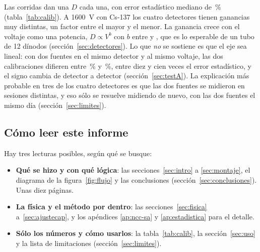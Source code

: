 \documentclass[11pt,a4paper]{article}
\begin{document}
Las \NCorridas{} corridas dan una $D$ cada una, con error estadístico
mediano de \ErrRelMediano\,\% (tabla~\ref{tab:calib}). A 1600~V con Cs-137
los cuatro detectores tienen ganancias muy distintas, un factor
\RazonGanancias{} entre el mayor y el menor. La ganancia crece con el voltaje
como una potencia, $D \propto V^{b}$ con $b$ entre \BMin{} y \BMax, que es lo
esperable de un tubo de 12 dínodos (sección~\ref{sec:detectores}). Lo que
\emph{no} se sostiene es que el eje sea lineal: con dos fuentes en el mismo
detector y al mismo voltaje, las dos calibraciones difieren entre
\DesacMin\,\% y \DesacMax\,\%, entre diez y cien veces el error estadístico, y el signo
cambia de detector a detector (sección~\ref{sec:testA}). La explicación más
probable en tres de los cuatro detectores es que las dos fuentes se midieron
en sesiones distintas, y eso sólo se resuelve midiendo de nuevo, con las dos
fuentes el mismo día (sección~\ref{sec:limites}).

\subsection{Cómo leer este informe}
\label{sec:comoleer}

Hay tres lecturas posibles, según qué se busque:

\begin{itemize}
\item \textbf{Qué se hizo y con qué lógica}: las secciones~\ref{sec:intro} a
      \ref{sec:montaje}, el diagrama de la figura~\ref{fig:flujo} y las
      conclusiones (sección~\ref{sec:conclusiones}). Unas diez páginas.
\item \textbf{La física y el método por dentro}: las
      secciones~\ref{sec:fisica} a~\ref{sec:ajustecap}, y los apéndices
      \ref{ap:ncc-sa} y \ref{ap:estadistica} para el detalle.
\item \textbf{Sólo los números y cómo usarlos}: la tabla~\ref{tab:calib}, la
      sección~\ref{sec:uso} y la lista de limitaciones
      (sección~\ref{sec:limites}).
\end{itemize}
\end{document}
